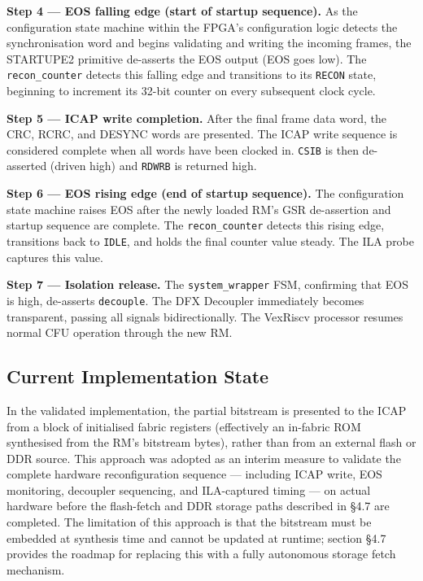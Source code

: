 \textbf{Step 4 — EOS falling edge (start of startup sequence).} As the configuration state machine within the FPGA's configuration logic detects the synchronisation word and begins validating and writing the incoming frames, the STARTUPE2 primitive de-asserts the EOS output (EOS goes low). The \texttt{recon\_counter} detects this falling edge and transitions to its \texttt{RECON} state, beginning to increment its 32-bit counter on every subsequent clock cycle.

\textbf{Step 5 — ICAP write completion.} After the final frame data word, the CRC, RCRC, and DESYNC words are presented. The ICAP write sequence is considered complete when all words have been clocked in. \texttt{CSIB} is then de-asserted (driven high) and \texttt{RDWRB} is returned high.

\textbf{Step 6 — EOS rising edge (end of startup sequence).} The configuration state machine raises EOS after the newly loaded RM's GSR de-assertion and startup sequence are complete. The \texttt{recon\_counter} detects this rising edge, transitions back to \texttt{IDLE}, and holds the final counter value steady. The ILA probe captures this value.

\textbf{Step 7 — Isolation release.} The \texttt{system\_wrapper} FSM, confirming that EOS is high, de-asserts \texttt{decouple}. The DFX Decoupler immediately becomes transparent, passing all signals bidirectionally. The VexRiscv processor resumes normal CFU operation through the new RM.

\subsection{Current Implementation State}

In the validated implementation, the partial bitstream is presented to the ICAP from a block of initialised fabric registers (effectively an in-fabric ROM synthesised from the RM's bitstream bytes), rather than from an external flash or DDR source. This approach was adopted as an interim measure to validate the complete hardware reconfiguration sequence — including ICAP write, EOS monitoring, decoupler sequencing, and ILA-captured timing — on actual hardware before the flash-fetch and DDR storage paths described in §4.7 are completed. The limitation of this approach is that the bitstream must be embedded at synthesis time and cannot be updated at runtime; section §4.7 provides the roadmap for replacing this with a fully autonomous storage fetch mechanism.


